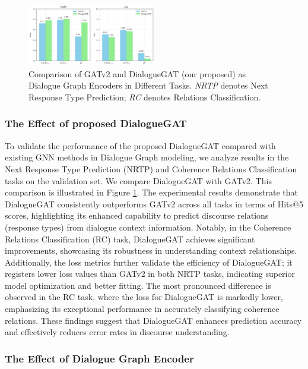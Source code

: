 \documentclass[letterpaper]{article} %
\begin{document}
\begin{figure}[ht]
    \centering
    \includegraphics[width=0.5\textwidth]{./images/compare_gatv2_dialoguegat.png}
    \caption{Comparison of GATv2 and DialogueGAT (our proposed) as Dialogue Graph Encoders in Different Tasks. \textit{NRTP} denotes Next Response Type Prediction; \textit{RC} denotes Relations Classification.}
    \label{fig:compare_gatv2_dialoguegat}
\end{figure}

\subsubsection{The Effect of proposed DialogueGAT}
To validate the performance of the proposed DialogueGAT compared with existing GNN methods in Dialogue Graph modeling, we analyze results in the Next Response Type Prediction (NRTP) and Coherence Relations Classification tasks on the validation set. We compare DialogueGAT with GATv2. This comparison is illustrated in Figure \ref{fig:compare_gatv2_dialoguegat}. The experimental results demonstrate that DialogueGAT consistently outperforms GATv2 across all tasks in terms of Hits@5 scores, highlighting its enhanced capability to predict discourse relations (response types) from dialogue context information. Notably, in the Coherence Relations Classification (RC) task, DialogueGAT achieves significant improvements, showcasing its robustness in understanding context relationships. Additionally, the loss metrics further validate the efficiency of DialogueGAT; it registers lower loss values than GATv2 in both NRTP tasks, indicating superior model optimization and better fitting. The most pronounced difference is observed in the RC task, where the loss for DialogueGAT is markedly lower, emphasizing its exceptional performance in accurately classifying coherence relations. These findings suggest that DialogueGAT enhances prediction accuracy and effectively reduces error rates in discourse understanding.

\subsubsection{The Effect of Dialogue Graph Encoder}
\end{document}
